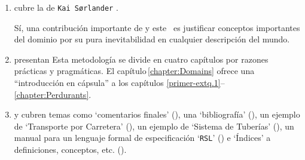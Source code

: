 \begin{enumerate}
\item {} cubre la  de
      \texttt{Kai S{\o}rlander}
      \cite{kaisorlander1994,kaisorlander1997,kaisorlander2002,kaisorlander2016,kaisorlander2022}.

      Sí, una contribución importante de \cite{BjornerMonograph2020} y
      este \manual\ es justificar conceptos importantes del dominio por
      su pura inevitabilidad en cualquier descripción del mundo.

\item {} presentan  Esta metodología se divide en cuatro capítulos por razones prácticas
    y pragmáticas. El capítulo\,\ref{chapter:Domains} ofrece una ``introducción
    en cápsula'' a los capítulos\,\,\ref{primer-extq.1}--\ref{chapter:Perdurants}. %
  
\item {}
  y  cubren
  temas como `comentarios finales' (\sort{\ref{chapter:Closing}}), una `bibliografía' (\sort{\ref{primer.bib}}), un ejemplo de `Transporte
  por Carretera' (\sort{\ref{Chapter:Road Transport}}), un ejemplo de `Sistema de Tuberías' (\sort{\ref{appendix:Pipelines}}), un manual para un lenguaje formal de especificación `\texttt{RSL}' (\sort{\ref{RSL-intro}}) e `Índices' a definiciones, conceptos, etc. (\sort{\ref{primer.indexes}}).
\end{enumerate}

\label{Prerequisite Skills}

